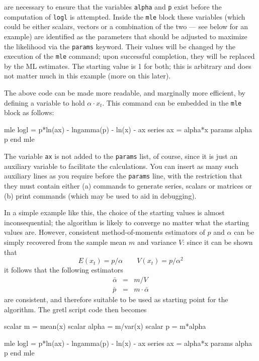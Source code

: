 are necessary to ensure that the variables \texttt{alpha} and
\texttt{p} exist before the computation of \texttt{logl} is
attempted. Inside the \texttt{mle} block these variables (which could
be either scalars, vectors or a combination of the two --- see below
for an example) are identified as the parameters that should be
adjusted to maximize the likelihood via the \texttt{params} keyword.
Their values will be changed by the execution of the \texttt{mle}
command; upon successful completion, they will be replaced by the ML
estimates. The starting value is 1 for both; this is arbitrary and
does not matter much in this example (more on this later).

The above code can be made more readable, and marginally more
efficient, by defining a variable to hold $\alpha \cdot x_t$. This
command can be embedded in the \texttt{mle} block as follows:
\begin{code}
mle logl =  p*ln(ax) - lngamma(p) - ln(x) - ax 
  series ax = alpha*x
  params alpha p
end mle 
\end{code}
The variable \texttt{ax} is not added to the \texttt{params} list,
of course, since it is just an auxiliary variable to facilitate
the calculations.  You can insert as many such auxiliary lines
as you require before the \texttt{params} line, with the restriction
that they must contain either (a) commands to generate series,
scalars or matrices or (b) print commands (which may be used to
aid in debugging).

In a simple example like this, the choice of the starting values is
almost inconsequential; the algorithm is likely to converge no
matter what the starting values are. However, consistent
method-of-moments estimators of $p$ and $\alpha$ can be simply
recovered from the sample mean $m$ and variance $V$: since it can be
shown that
\[
  E(x_t) = p/\alpha \qquad  V(x_t) = p/\alpha^2
\]
it follows that the following estimators 
\begin{eqnarray*}
  \bar{\alpha} & = &  m/V \\
  \bar{p} & = & m \cdot \bar{\alpha} 
\end{eqnarray*}
are consistent, and therefore suitable to be used as starting point
for the algorithm.  The gretl script code then becomes
\begin{code}
scalar m = mean(x)
scalar alpha = m/var(x)
scalar p = m*alpha

mle logl =  p*ln(ax) - lngamma(p) - ln(x) - ax 
  series ax = alpha*x
  params alpha p
end mle 
\end{code}

